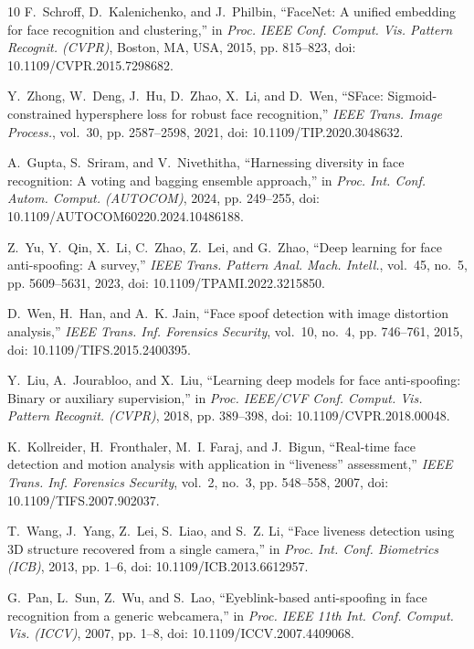 \documentclass{ieeeaccess}
\begin{document}
\begin{thebibliography}{10}
F.~Schroff, D.~Kalenichenko, and J.~Philbin, ``{FaceNet}: A unified embedding
  for face recognition and clustering,'' in \emph{Proc. IEEE Conf. Comput. Vis.
  Pattern Recognit. (CVPR)}, Boston, MA, USA, 2015, pp. 815--823, doi:
  10.1109/CVPR.2015.7298682.

Y.~Zhong, W.~Deng, J.~Hu, D.~Zhao, X.~Li, and D.~Wen, ``{SFace}:
  Sigmoid-constrained hypersphere loss for robust face recognition,''
  \emph{IEEE Trans. Image Process.}, vol.~30, pp. 2587--2598, 2021, doi:
  10.1109/TIP.2020.3048632.

A.~Gupta, S.~Sriram, and V.~Nivethitha, ``Harnessing diversity in face
  recognition: A voting and bagging ensemble approach,'' in \emph{Proc. Int.
  Conf. Autom. Comput. (AUTOCOM)}, 2024, pp. 249--255, doi:
  10.1109/AUTOCOM60220.2024.10486188.

Z.~Yu, Y.~Qin, X.~Li, C.~Zhao, Z.~Lei, and G.~Zhao, ``Deep learning for face
  anti-spoofing: A survey,'' \emph{IEEE Trans. Pattern Anal. Mach. Intell.},
  vol.~45, no.~5, pp. 5609--5631, 2023, doi: 10.1109/TPAMI.2022.3215850.

D.~Wen, H.~Han, and A.~K. Jain, ``Face spoof detection with image distortion
  analysis,'' \emph{IEEE Trans. Inf. Forensics Security}, vol.~10, no.~4, pp.
  746--761, 2015, doi: 10.1109/TIFS.2015.2400395.

Y.~Liu, A.~Jourabloo, and X.~Liu, ``Learning deep models for face
  anti-spoofing: Binary or auxiliary supervision,'' in \emph{Proc. IEEE/CVF
  Conf. Comput. Vis. Pattern Recognit. (CVPR)}, 2018, pp. 389--398, doi:
  10.1109/CVPR.2018.00048.

K.~Kollreider, H.~Fronthaler, M.~I. Faraj, and J.~Bigun, ``Real-time face
  detection and motion analysis with application in ``liveness'' assessment,''
  \emph{IEEE Trans. Inf. Forensics Security}, vol.~2, no.~3, pp. 548--558,
  2007, doi: 10.1109/TIFS.2007.902037.

T.~Wang, J.~Yang, Z.~Lei, S.~Liao, and S.~Z. Li, ``Face liveness detection
  using {3D} structure recovered from a single camera,'' in \emph{Proc. Int.
  Conf. Biometrics (ICB)}, 2013, pp. 1--6, doi: 10.1109/ICB.2013.6612957.

G.~Pan, L.~Sun, Z.~Wu, and S.~Lao, ``Eyeblink-based anti-spoofing in face
  recognition from a generic webcamera,'' in \emph{Proc. IEEE 11th Int. Conf.
  Comput. Vis. (ICCV)}, 2007, pp. 1--8, doi: 10.1109/ICCV.2007.4409068.


\end{thebibliography}
\end{document}
